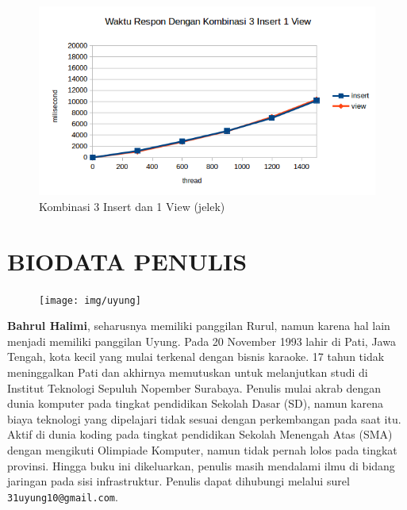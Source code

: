 \documentclass{ta-its}
\begin{document}
		\begin{figure}[t] %
			\centering
			\includegraphics[width=0.85\linewidth]{contoh_img/hasil/3-1-jelek}
			\caption{Kombinasi 3 Insert dan 1 View (jelek)}
			\label{gambar3-1jelek}
		\end{figure}
		

\backmatter %
	\chapter{BIODATA PENULIS}
		\begin{figure}
			\texttt{[image: img/uyung]}
		\end{figure}
		
		\textbf{Bahrul Halimi}, seharusnya memiliki panggilan Rurul, namun karena hal lain menjadi memiliki panggilan Uyung. Pada 20 November 1993 lahir di Pati, Jawa Tengah, kota kecil yang mulai terkenal dengan bisnis karaoke. 17 tahun tidak meninggalkan Pati dan akhirnya memutuskan untuk melanjutkan studi di Institut Teknologi Sepuluh Nopember Surabaya. Penulis mulai akrab dengan dunia komputer pada tingkat pendidikan Sekolah Dasar (SD), namun karena biaya teknologi yang dipelajari tidak sesuai dengan perkembangan pada saat itu. Aktif di dunia koding pada tingkat pendidikan Sekolah Menengah Atas (SMA) dengan mengikuti Olimpiade Komputer, namun tidak pernah lolos pada tingkat provinsi. Hingga buku ini dikeluarkan, penulis masih mendalami ilmu di bidang jaringan pada sisi infrastruktur. Penulis dapat dihubungi melalui surel \texttt{31uyung10@gmail.com}.
\end{document}

